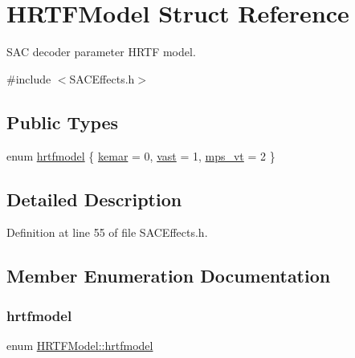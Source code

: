 \hypertarget{struct_h_r_t_f_model}{}\section{H\+R\+T\+F\+Model Struct Reference}
\label{struct_h_r_t_f_model}


S\+AC decoder parameter H\+R\+TF model.  




{\ttfamily \#include $<$S\+A\+C\+Effects.\+h$>$}

\subsection*{Public Types}
\begin{DoxyCompactItemize}
\item 
enum \hyperlink{struct_h_r_t_f_model_ae01efd7375e498a14624bbeebb93fa82}{hrtfmodel} \{ \hyperlink{struct_h_r_t_f_model_ae01efd7375e498a14624bbeebb93fa82ab2fb75879caf4bc494c4ef05c68296fa}{kemar} = 0, 
\hyperlink{struct_h_r_t_f_model_ae01efd7375e498a14624bbeebb93fa82a3c1d54f796975db036c93d624e6f2730}{vast} = 1, 
\hyperlink{struct_h_r_t_f_model_ae01efd7375e498a14624bbeebb93fa82a14e4aa4784083d62a00452f4d32b4098}{mps\+\_\+vt} = 2
 \}
\end{DoxyCompactItemize}


\subsection{Detailed Description}


Definition at line 55 of file S\+A\+C\+Effects.\+h.



\subsection{Member Enumeration Documentation}
\mbox{\label{struct_h_r_t_f_model_ae01efd7375e498a14624bbeebb93fa82}} 
\subsubsection{\texorpdfstring{hrtfmodel}{hrtfmodel}}
{\footnotesize\ttfamily enum \hyperlink{struct_h_r_t_f_model_ae01efd7375e498a14624bbeebb93fa82}{H\+R\+T\+F\+Model\+::hrtfmodel}}

